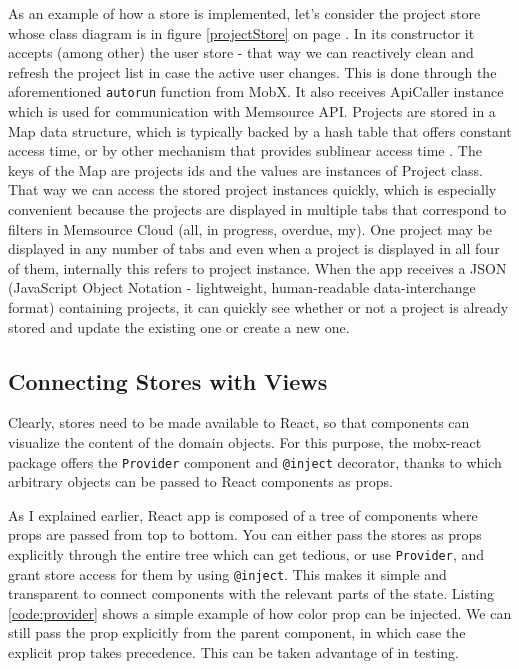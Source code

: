 As an example of how a store is implemented, let's consider the project store whose class diagram is in figure \ref{projectStore} on page \pageref{projectStore}. In its constructor it accepts (among other) the user store - that way we can reactively clean and refresh the project list in case the active user changes. This is done through the aforementioned \texttt{autorun} function from MobX. It also receives ApiCaller instance which is used for communication with Memsource API. Projects are stored in a Map data structure, which is typically backed by a hash table that offers constant access time, or by other mechanism that provides sublinear access time \cite{ecma:map}. The keys of the Map are projects ids and the values are instances of Project class. That way we can access the stored project instances quickly, which is especially convenient because the projects are displayed in multiple tabs that correspond to filters in Memsource Cloud (all, in progress, overdue, my). One project may be displayed in any number of tabs and even when a project is displayed in all four of them, internally this refers to  project instance. When the app receives a JSON  (JavaScript Object Notation - lightweight, human-readable data-interchange format) containing projects, it can quickly see whether or not a project is already stored and update the existing one or create a new one.


\subsection{Connecting Stores with Views}

Clearly, stores need to be made available to React, so that components can visualize the content of the domain objects. For this purpose, the mobx-react package offers the \texttt{Provider} component and \texttt{@inject} decorator, thanks to which arbitrary objects can be passed to React components as props.

As I explained earlier, React app is composed of a tree of components where props are passed from top to bottom. You can either pass the stores as props explicitly through the entire tree which can get tedious, or use \texttt{Provider}, and grant store access for them by using \texttt{@inject}. This makes it simple and transparent to connect components with the relevant parts of the state. Listing \ref{code:provider} shows a simple example of how color prop can be injected. We can still pass the prop explicitly from the parent component, in which case the explicit prop takes precedence. This can be taken advantage of in testing.

